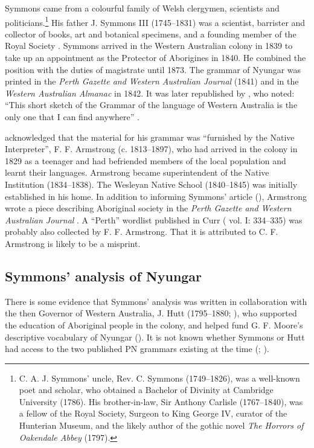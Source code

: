\newpage
Symmons came from a colourful family of Welsh clergymen, scientists and politicians.\footnote{C. A. J. Symmons' uncle, Rev. C. Symmons (1749--1826), was a well-known poet and scholar, who obtained a Bachelor of Divinity at Cambridge University (1786). His brother-in-law, Sir Anthony Carlisle (1767--1840), was a fellow of the Royal Society, Surgeon to King George IV, curator of the Hunterian Museum, and the likely author of the gothic novel \textit{The Horrors of Oakendale Abbey} (1797).}  His father J. Symmons III (1745–1831) was a scientist, barrister and collector of books, art and botanical specimens, and a founding member of the Royal Society \citep{Conole2013}. Symmons arrived in the Western Australian colony in 1839 to take up an appointment as the Protector of Aborigines in 1840. He combined the position with the duties of magistrate until 1873. The grammar of Nyungar was printed in the \textit{Perth Gazette and Western Australian Journal} (1841) and in the \textit{Western Australian Almanac} in 1842. It was later republished by \citet{fraser_australian_1892}, who noted: “This short sketch of the Grammar of the language of Western Australia is the only one that I can find anywhere” \citep[48]{fraser_australian_1892}.

\citet[i]{symmons_grammatical_1841} acknowledged that the material for his grammar was “furnished by the Native Interpreter”, F. F. Armstrong (c. 1813--1897), who had arrived in the colony in 1829 as a teenager and had befriended members of the local population and learnt their languages. Armstrong became superintendent of the Native Institution (1834--1838). The Wesleyan Native School (1840--1845) was initially established in his home. In addition to informing Symmons' article (\citeyear{symmons_grammatical_1841}), Armstrong wrote a piece describing Aboriginal society in the \textit{Perth Gazette and Western Australian Journal} \citeyearpar{armstrong_manners_1836}. A “Perth” wordlist published in Curr (\citeyear{curr_australian_1886} vol. I: 334--335) was probably also collected by F. F. Armstrong. That it is attributed to C. F. Armstrong is likely to be a misprint.

\subsection{Symmons' analysis of Nyungar \citeyearpar{symmons_grammatical_1841}}
\label{sec:key:7.1.1}

There is some evidence that Symmons' analysis was written in collaboration with the then Governor of Western Australia, J. Hutt (1795--1880; \citealt[305]{ferguson_bibliography_1951}), who supported the education of Aboriginal people in the colony, and helped fund G. F. Moore’s descriptive vocabulary of Nyungar (\citeyear{moore_descriptive_1842}). It is not known whether Symmons or Hutt had access to the two published PN grammars existing at the time (\citealt{threlkeld_australian_1834}; \citealt{teichelmann_outlines_1840}).

